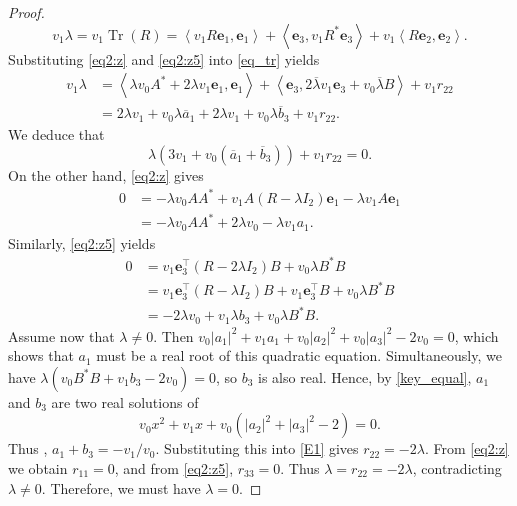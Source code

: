 \documentclass[12pt, reqno]{amsart}
\theoremstyle{definition}
\theoremstyle{remark}
\numberwithin{equation}{section}
\begin{document}
\begin{proof}
\begin{equation}
		v_1 \lambda = v_1 \operatorname{Tr}(R)
		= \left\langle v_1 R \mathbf{e}_1, \mathbf{e}_1 \right\rangle + \left\langle \mathbf{e}_3, v_1 R^* \mathbf{e}_3 \right\rangle+v_1\left\langle R  \mathbf{e}_2, \mathbf{e}_2 \right\rangle. 
	\end{equation}
	Substituting \eqref{eq2:z} and \eqref{eq2:z5} into \eqref{eq_tr} yields
	\begin{align*}
		v_1 \lambda 
		&= \left\langle \lambda v_0 A^* + 2\lambda v_1 \mathbf{e}_1, \mathbf{e}_1 \right\rangle + \left\langle \mathbf{e}_3, 2\overline{\lambda} v_1 \mathbf{e}_3 + v_0 \overline{\lambda} B \right\rangle +v_1r_{22}\\
		&= 2\lambda v_1 + v_0 \lambda \overline{a}_1 + 2\lambda v_1 + v_0 \lambda \overline{b}_3+v_1r_{22}.
	\end{align*}
	We deduce that 
	\begin{equation}\label{E1}
		\lambda \left( 3v_1 + v_0(\overline{a}_1+ \overline{b}_3) \right)+v_1r_{22} = 0.
	\end{equation}
On the other hand,  \eqref{eq2:z}  gives
	\begin{align*}
		0 &= -\lambda v_0 A A^* + v_1 A (R - \lambda I_2) \mathbf{e}_1 - \lambda v_1 A \mathbf{e}_1 \\
		&= -\lambda v_0 A A^* + 2\lambda v_0 - \lambda v_1 a_1. 
	\end{align*}
	Similarly,  \eqref{eq2:z5} yields 
	\begin{align*}
		0 &= v_1\mathbf{e}_3^\top  (R - 2\lambda I_2)B + v_0 \lambda B^* B \\
		&= v_1\mathbf{e}_3^\top  (R - \lambda I_2)B+v_1\mathbf{e}_3^\top B + v_0 \lambda B^* B \\
		&= -2\lambda v_0 + v_1 \lambda b_3 + v_0 \lambda B^* B.
	\end{align*} 
	Assume now that $\lambda \neq 0$. Then $v_0 |a_1|^2 + v_1 a_1 + v_0 |a_2|^2 + v_0 |a_3|^2 - 2v_0 = 0$, which shows that $a_1$ must be a real root of this quadratic equation. Simultaneously, we have $\lambda (v_0 B^* B + v_1 b_3 - 2v_0) = 0$, so $b_3$ is also real. Hence, by \eqref{key_equal}, $a_1$ and $b_3$ are two real solutions of
	\[
	v_0 x^2 + v_1 x + v_0 (|a_2|^2 + |a_3|^2 - 2) = 0.
	\]
Thus , $a_1 + b_3 = -v_1/v_0$. Substituting this into \eqref{E1} gives $r_{22} =-2\lambda$. From \eqref{eq2:z} we obtain $r_{11}=0$, and from \eqref{eq2:z5}, $r_{33} = 0$. Thus $\lambda =r_{22} =-2\lambda$, contradicting $\lambda\neq 0$. Therefore, we must have $\lambda = 0$.
	

\end{proof}
\end{document}
